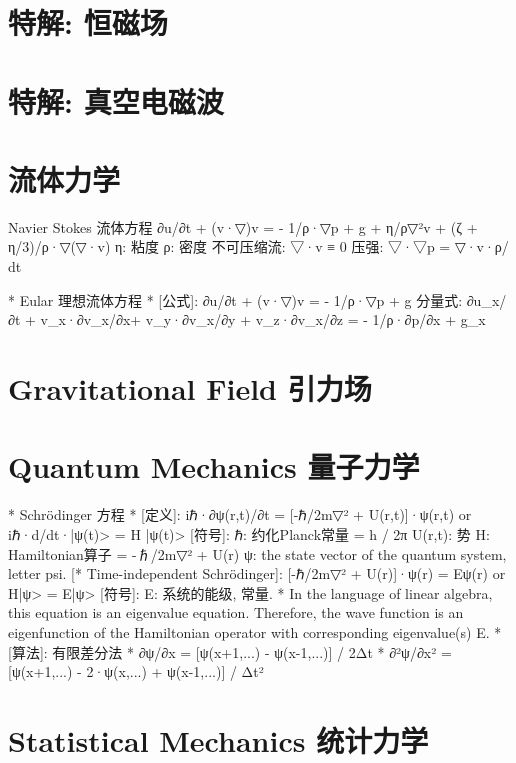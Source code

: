 \section{特解: 恒磁场}


\section{特解: 真空电磁波}



\section{流体力学}
    Navier Stokes 流体方程
    ∂\vec u/∂t + (\vec v·▽)\vec v =  - 1/ρ·▽p  + \vec g + η/ρ▽²\vec v + (ζ + η/3)/ρ·▽(▽·\vec v)
			η: 粘度    ρ: 密度
			不可压缩流: ▽·\vec v ≡ 0
			压强: ▽·▽p = ▽·v·ρ/ dt

*                   Eular 理想流体方程
*	[公式]: ∂\vec u/∂t + (\vec v·▽)\vec v = - 1/ρ·▽p + \vec g
		分量式:
			∂u_x/∂t + v_x·∂v_x/∂x+ v_y·∂v_x/∂y + v_z·∂v_x/∂z = - 1/ρ·∂p/∂x + g_x


\section{Gravitational Field 引力场}



\section{Quantum Mechanics 量子力学}
*                    Schrödinger 方程
*	[定义]: iℏ·∂ψ(r,t)/∂t = [-ℏ/2m▽² + U(r,t)]·ψ(r,t)
		or	iℏ·d/dt·|ψ(t)> = H |ψ(t)>
		[符号]:
			ℏ: 约化Planck常量 = h / 2π    U(r,t): 势
			H: Hamiltonian算子 = -ℏ/2m▽² + U(r)
			ψ: the state vector of the quantum system, letter psi.
		[* Time-independent Schrödinger]:
			[-ℏ/2m▽² + U(r)]·ψ(r)  = Eψ(r)
		or	H|ψ> = E|ψ>
		[符号]: E: 系统的能级, 常量.
		* In the language of linear algebra, this equation is an eigenvalue equation.
		  Therefore, the wave function is an eigenfunction of the Hamiltonian operator
		  with corresponding eigenvalue(s) E.
*	[算法]: 有限差分法
		* ∂ψ/∂x   = [ψ(x+1,...) - ψ(x-1,...)] / 2Δt
		* ∂²ψ/∂x² = [ψ(x+1,...) - 2·ψ(x,...) + ψ(x-1,...)] / Δt²


\section{Statistical Mechanics 统计力学}






